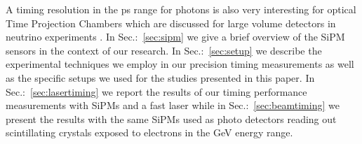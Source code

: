A timing resolution in the ps range for photons is also very interesting for optical Time Projection Chambers 
which are discussed for large volume detectors in neutrino experiments \cite{lappd, otpc}. 
%
%
%
In Sec.:~\ref{sec:sipm} we give a brief overview of the SiPM sensors in the context of our research. In Sec.:~\ref{sec:setup} 
we describe the experimental techniques we employ in our precision timing measurements as well as the specific setups we 
used for the studies presented in this paper. In Sec.:~\ref{sec:lasertiming} we report the results of our timing performance measurements with SiPMs and a fast laser while in Sec.:~\ref{sec:beamtiming} we present the results with the same SiPMs used as photo detectors reading out scintillating crystals exposed to electrons in the GeV energy range.

